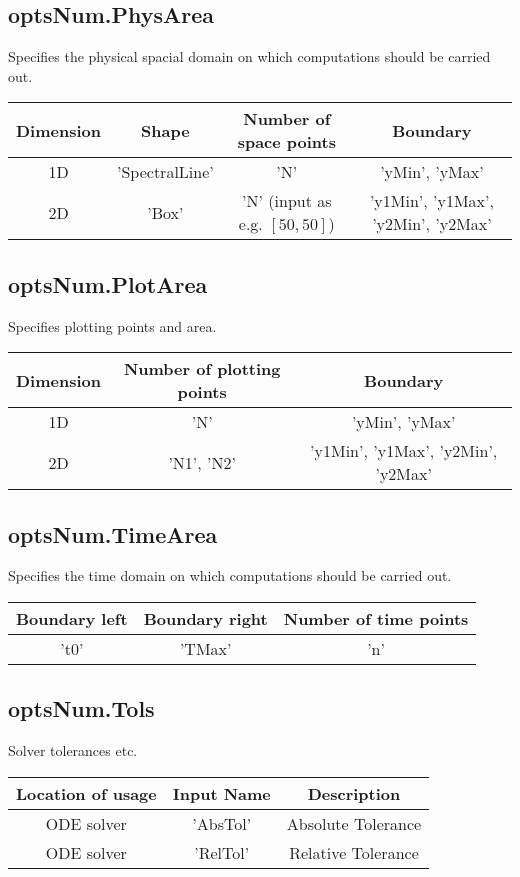 \documentclass[11pt, a4paper]{article}
\theoremstyle{definition}
\begin{document}
\subsection{optsNum.PhysArea}
Specifies the physical spacial domain on which computations should be carried out.
\begin{center}
	\begin{tabular}{ |c| c | c| c|}
		\hline
		Dimension &  Shape & Number of space points & Boundary \\ 
		\hline
		 1D & 'SpectralLine' & 'N' & 'yMin', 'yMax'\\
		 2D & 'Box' & 'N' (input as e.g. $[50,50]$) & 'y1Min', 'y1Max', 'y2Min', 'y2Max' \\ 
		\hline 
	\end{tabular}
\end{center}
\subsection{optsNum.PlotArea}
Specifies plotting points and area. 
\begin{center}
	\begin{tabular}{ |c| c | c| }
		\hline
		Dimension & Number of plotting points & Boundary \\ 
		\hline
		1D   & 'N' & 'yMin', 'yMax'\\
		2D & 'N1', 'N2'  & 'y1Min', 'y1Max', 'y2Min', 'y2Max' \\ 
		\hline 
	\end{tabular}
\end{center}	
\subsection{optsNum.TimeArea}
Specifies the time domain on which computations should be carried out.
\begin{center}
	\begin{tabular}{ | c | c | c |}
		\hline
		 Boundary left & Boundary right & Number of time points  \\ 
		\hline
	    't0' & 'TMax' & 'n'\\
		\hline 
	\end{tabular}
\end{center}	
	
\subsection{optsNum.Tols}
Solver tolerances etc.
\begin{center}
	\begin{tabular}{ | c | c | c |}
		\hline
	     Location of usage & Input Name  & Description  \\ 
		\hline
		ODE solver & 'AbsTol' & Absolute Tolerance  \\
		ODE solver & 'RelTol' & Relative Tolerance  \\ 
		\hline
	\end{tabular}
\end{center}
	
\end{document}
